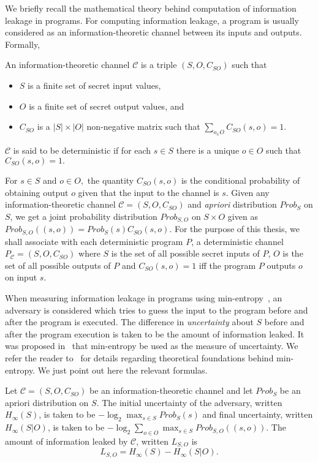 
\newcommand{\calC} {\mathcal{C}}


We briefly recall the mathematical theory behind computation of information leakage in programs. 
For computing information leakage, a program is usually considered as an information-theoretic channel between its inputs and outputs. Formally, 
\begin{mydef}
An information-theoretic channel $\calC$ is a triple $(S,O, C_{SO})$ such that 
\begin{itemize}
\item  $S$ is a finite set of secret input values,
\item $O$ is a finite set of secret output values, and 
\item $C_{SO}$ is a $|S| \times |O|$ non-negative matrix such that $\sum_{o_\in O} C_{SO}(s,o) =1. $
\end{itemize}
$\calC$ is said to be deterministic if for each $s\in S$ there is a unique $o \in O$  such that $C_{SO}(s,o)=1.$
\end{mydef}

For $s\in S$ and $o\in O,$ the quantity $C_{SO}(s,o)$ is  the conditional probability of obtaining output
$o$  given that the input to the channel is $s$. 
Given any information-theoretic channel $\calC=(S,O, C_{SO})$ and \emph{apriori} distribution $Prob_S$ on $S$,   we get a joint probability distribution $Prob_{S,O}$ on 
$S\times O$ given as  
$ Prob_{S,O} ((s,o))= Prob_S (s) C_{SO} (s,o).$  For the purpose of this thesis, we shall associate with each deterministic program $P$, a  deterministic  channel $P_\calC= (S,O, C_{SO})$ 
where $S$ is the set of all possible secret inputs of $P$, $O$ is the set of all possible outputs of $P$ and  $C_{SO}(s,o)=1$ iff
the program $P$ outputs $o$ on input $s.$ 

When measuring information leakage in programs using min-entropy~\cite{Smith},  an adversary  is considered which tries to guess the input to the program before and after the program is executed.  The difference in \emph{uncertainty} about  $S$ before and after the program execution is taken to be the amount of information leaked. It was proposed in~\cite{Smith}
that min-entropy be used as the measure of uncertainty. We refer the reader to~\cite{Smith} for details regarding theoretical foundations behind min-entropy.  We just point out here the relevant formulas. 

\begin{mydef}
Let $\calC=(S,O, C_{SO})$ be an information-theoretic channel and let  $Prob_S$ be an apriori distribution on $S.$
 The initial uncertainty of the adversary, written  $ H_{\infty}(S) $, is taken to be $-\log_2 \max_{s\in S} Prob_S(s) $ and final uncertainty, written  $ H_{\infty}(S | O) $,  is taken to be $-\log_2 \sum_{o\in O} \max_{s\in S} Prob_{S,O}((s,o)).$ The amount of information leaked by $\calC$, written $L_{S,O}$ is
 $$ L_{S,O} =  H_{\infty}(S) - H_{\infty}(S | O).$$
\end{mydef}


